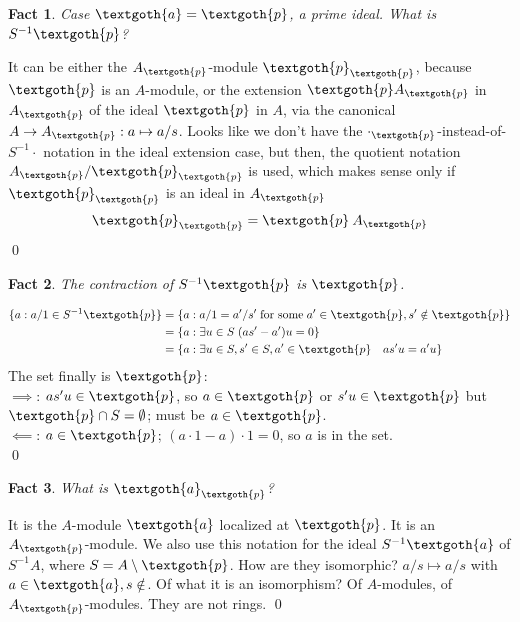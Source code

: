 \documentclass{article}
\newtheorem{theorem}{Fact}[section]
\begin{document}
\bigskip
\begin{theorem}
Case $\textgoth{a} = \textgoth{p}$, a prime ideal. What is $S^{-1}\textgoth{p}$?
\end{theorem}

\noindent
It can be either the $A_\textgoth{p}$-module $\textgoth{p}_\textgoth{p}$, because $\textgoth{p}$ is an $A$-module, or the extension $\textgoth{p} A_\textgoth{p}$ in $A_\textgoth{p}$ of the ideal $\textgoth{p}$ in $A$, via the canonical $A \rightarrow A_\textgoth{p} : a \mapsto a/s$. Looks like we don't have the $\cdot_\textgoth{p}$-instead-of-$S^{-1} \cdot$ notation in the ideal extension case, but then, the quotient notation $ A_\textgoth{p} / \textgoth{p}_\textgoth{p}$ is used, which makes sense only if $\textgoth{p}_\textgoth{p}$ is an ideal in $A_\textgoth{p}$
\[
   \textgoth{p}_\textgoth{p} = \textgoth{p} \: A_\textgoth{p}
\]
\qed

\bigskip
\begin{theorem}
The contraction of $S^{-1}\textgoth{p}$ is $\textgoth{p}$.
\end{theorem}

\noindent
\begin{equation*}
\begin{split}
\{a: a/1 \in S^{-1}\textgoth{p}\} & = \{ a: a/1 = a'/s' \; \text{for some} \; a' \in \textgoth{p}, s' \notin \textgoth{p} \} \\
& = \{a: \exists u \in S \; (as' - a')u = 0 \} \\
& = \{a: \exists u \in S, s' \in S, a' \in \textgoth{p} \quad as'u = a'u  \}
\end{split}
\end{equation*}
The set finally is $\textgoth{p}$: \\
$\implies$: $as'u \in \textgoth{p}$, so $a \in \textgoth{p}$ or $s'u \in \textgoth{p}$ but $\textgoth{p} \cap S = \emptyset$; must be $a \in \textgoth{p}$. \\
$\impliedby$: $a \in \textgoth{p}$; $(a \cdot 1 - a)\cdot 1 = 0$, so $a$ is in the set. \\
\qed

\bigskip
\begin{theorem}
What is $\textgoth{a}_\textgoth{p}$?
\end{theorem}

\noindent
It is the $A$-module $\textgoth{a}$ localized at $\textgoth{p}$. It is an $A_\textgoth{p}$-module. We also use this notation for the ideal $S^{-1}\textgoth{a}$ of $S^{-1}A$, where $S = A \setminus \textgoth{p}$. How are they isomorphic? $a/s \mapsto a/s$ with $a \in \textgoth{a}, s \notin $.  Of what it is an isomorphism? Of $A$-modules, of $A_\textgoth{p}$-modules. They are not rings.
\qed
\end{document}
